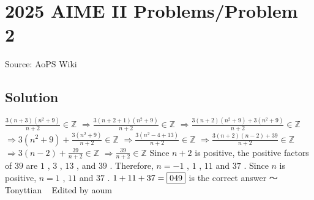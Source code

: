 \documentclass[12pt]{article}
\begin{document}
\section*{{2025 AIME II Problems/Problem 2}}
Source: AoPS Wiki

\subsection*{Solution}
$\frac{3(n+3)(n^{2}+9) }{n+2} \in \mathbb{Z}$ $\Rightarrow \frac{3(n+2+1)(n^{2}+9) }{n+2} \in \mathbb{Z}$ $\Rightarrow \frac{3(n+2)(n^{2}+9) +3(n^{2}+9)}{n+2} \in \mathbb{Z}$ $\Rightarrow 3(n^{2}+9)+\frac{3(n^{2}+9)}{n+2} \in \mathbb{Z}$ $\Rightarrow \frac{3(n^{2}-4+13)}{n+2} \in \mathbb{Z}$ $\Rightarrow \frac{3(n+2)(n-2)+39}{n+2} \in \mathbb{Z}$ $\Rightarrow 3(n-2)+\frac{39}{n+2} \in \mathbb{Z}$ $\Rightarrow \frac{39}{n+2} \in \mathbb{Z}$ Since $n + 2$ is positive, the positive factors of $39$ are $1$ , $3$ , $13$ , and $39$ . Therefore, $n = -1$ , $1$ , $11$ and $37$ . Since $n$ is positive, $n = 1$ , $11$ and $37$ . $1 + 11 + 37 = \framebox{049}$ is the correct answer ～ Tonyttian ~ Edited by aoum
\end{document}
